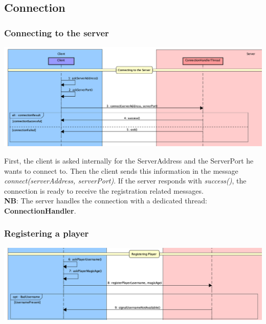 \documentclass[12pt]{article}
\begin{document}
		\subsection{Connection}
		
			\subsubsection{Connecting to the server}
			
				\begin{center}
					\includegraphics[width=\textwidth,height=\textheight,keepaspectratio]{Connection_1}
				\end{center}
			
				First, the client is asked internally for the ServerAddress and the ServerPort he wants to connect to. Then the client sends this information in the message \emph{connect(serverAddress, serverPort)}. If the server responds with \emph{success()}, the connection is ready to receive the registration related messages. \\
				\textbf{NB}: The server handles the connection with a dedicated thread: \textbf{ConnectionHandler}.
				
			\subsubsection{Registering a player}
			
				\begin{center}
					\includegraphics[width=\textwidth,height=\textheight,keepaspectratio]{Connection_2}
				\end{center}
			
\end{document}
